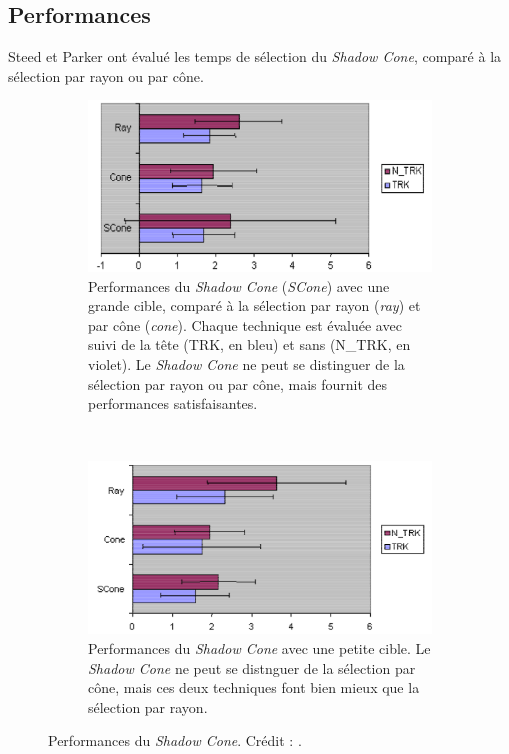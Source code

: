 	\subsection{Performances}
	Steed et Parker ont évalué les temps de sélection du \emph{Shadow Cone}, comparé à la sélection par rayon ou par cône.

	\begin{figure}[!htb]
		\begin{subfigure}[t]{0.49\textwidth}
			\centering
			\includegraphics[width=\textwidth]{figures/ch2/shadowSLarge}
			\caption{Performances du \emph{Shadow Cone} (\emph{SCone}) avec une grande cible, comparé à la sélection par rayon (\emph{ray}) et par cône (\emph{cone}). Chaque technique est évaluée avec suivi de la tête (TRK, en bleu) et sans (N\_{}TRK, en violet). Le \emph{Shadow Cone} ne peut se distinguer de la sélection par rayon ou par cône, mais fournit des performances satisfaisantes.}
			\label{fig:shadowSLarge}
		\end{subfigure}
		~
		\begin{subfigure}[t]{0.49\textwidth}
			\centering
			\includegraphics[width=\textwidth]{figures/ch2/shadowSSmall}
			\caption{Performances du \emph{Shadow Cone} avec une petite cible. Le \emph{Shadow Cone} ne peut se distnguer de la sélection par cône, mais ces deux techniques font bien mieux que la sélection par rayon.}
			\label{fig:shadowSSmall}
		\end{subfigure}
		\caption[Performances du \emph{Shadow Cone}]{Performances du \emph{Shadow Cone}. Crédit : \cite{steed20043d}.}
		\label{fig:shadowConePerf}
	\end{figure}
	
